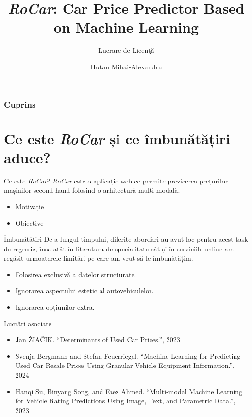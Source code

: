 \documentclass[aspectratio=169]{beamer}
\title[Car Price Predictor Based on Machine Learning]
{\emph{RoCar}: Car Price Predictor Based on Machine Learning}
\subtitle{Lucrare de Licen\c t\u a}
\author
{Huțan Mihai-Alexandru}
\institute[Unibuc]
{
	Facultatea de Matematic\u a-Informatic\u a\\
	Universitatea din Bucure\c sti
}
\begin{document}
\frame{\titlepage}


\begin{frame}
	\frametitle{Cuprins}
	\tableofcontents
\end{frame}

\section{Ce este \emph{RoCar} și ce îmbunătățiri aduce?}

\begin{frame}{Ce este \emph{RoCar}?}
    \emph{RoCar} este o aplicație web ce permite prezicerea prețurilor mașinilor second-hand folosind o arhitectură multi-modală.\\
    \vspace{10pt}
    \begin{itemize}
        \item Motivație
        \item Obiective
    \end{itemize}
\end{frame}

\begin{frame}{Îmbunătățiri}
    De-a lungul timpului, diferite abordări au avut loc pentru acest task de regresie, însă atât în literatura de specialitate cât și în serviciile online am regăsit urmoaterele limitări pe care am vrut să le îmbunătățim.
    \vspace{10pt}

    \begin{itemize}
        \item Folosirea exclusivă a datelor structurate.
        \item Ignorarea aspectului estetic al autovehiculelor.
        \item Ignorarea opțiunilor extra.
    \end{itemize}
\end{frame}

\begin{frame}{Lucrări asociate}
    \begin{itemize}
        \item  Jan ŽIAČIK. “Determinants of Used Car Prices.”, 2023
        \item Svenja Bergmann and Stefan Feuerriegel. “Machine Learning for Predicting Used Car Resale Prices Using Granular Vehicle Equipment Information.”, 2024
        \item Hanqi Su, Binyang Song, and Faez Ahmed. “Multi-modal Machine Learning for Vehicle Rating Predictions Using Image, Text, and Parametric Data.”, 2023
    \end{itemize}
\end{frame}
\end{document}
